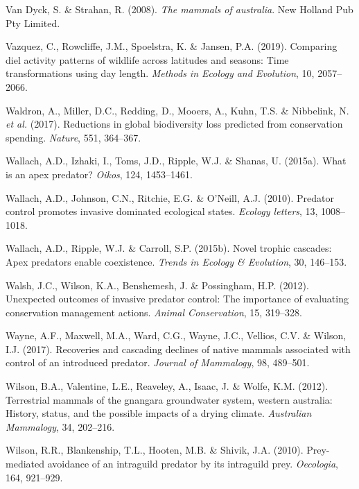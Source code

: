 \documentclass[11pt,a4paper,titlepage,twoside,openright]{style/unimelbthesis}
\begin{document}
\begin{mainmatter}
\leavevmode\hypertarget{ref-van2008mammals}{}%
Van Dyck, S. \& Strahan, R. (2008). \emph{The mammals of australia}. New Holland Pub Pty Limited.

\leavevmode\hypertarget{ref-vazquez2019comparing}{}%
Vazquez, C., Rowcliffe, J.M., Spoelstra, K. \& Jansen, P.A. (2019). Comparing diel activity patterns of wildlife across latitudes and seasons: Time transformations using day length. \emph{Methods in Ecology and Evolution}, 10, 2057--2066.

\leavevmode\hypertarget{ref-waldron2017reductions}{}%
Waldron, A., Miller, D.C., Redding, D., Mooers, A., Kuhn, T.S. \& Nibbelink, N. \emph{et al.} (2017). Reductions in global biodiversity loss predicted from conservation spending. \emph{Nature}, 551, 364--367.

\leavevmode\hypertarget{ref-wallach2015apex}{}%
Wallach, A.D., Izhaki, I., Toms, J.D., Ripple, W.J. \& Shanas, U. (2015a). What is an apex predator? \emph{Oikos}, 124, 1453--1461.

\leavevmode\hypertarget{ref-wallach2010predator}{}%
Wallach, A.D., Johnson, C.N., Ritchie, E.G. \& O'Neill, A.J. (2010). Predator control promotes invasive dominated ecological states. \emph{Ecology letters}, 13, 1008--1018.

\leavevmode\hypertarget{ref-wallach2015novel}{}%
Wallach, A.D., Ripple, W.J. \& Carroll, S.P. (2015b). Novel trophic cascades: Apex predators enable coexistence. \emph{Trends in Ecology \& Evolution}, 30, 146--153.

\leavevmode\hypertarget{ref-walsh2012unexpected}{}%
Walsh, J.C., Wilson, K.A., Benshemesh, J. \& Possingham, H.P. (2012). Unexpected outcomes of invasive predator control: The importance of evaluating conservation management actions. \emph{Animal Conservation}, 15, 319--328.

\leavevmode\hypertarget{ref-wayne2017recoveries}{}%
Wayne, A.F., Maxwell, M.A., Ward, C.G., Wayne, J.C., Vellios, C.V. \& Wilson, I.J. (2017). Recoveries and cascading declines of native mammals associated with control of an introduced predator. \emph{Journal of Mammalogy}, 98, 489--501.

\leavevmode\hypertarget{ref-wilson2012terrestrial}{}%
Wilson, B.A., Valentine, L.E., Reaveley, A., Isaac, J. \& Wolfe, K.M. (2012). Terrestrial mammals of the gnangara groundwater system, western australia: History, status, and the possible impacts of a drying climate. \emph{Australian Mammalogy}, 34, 202--216.

\leavevmode\hypertarget{ref-wilson2010prey}{}%
Wilson, R.R., Blankenship, T.L., Hooten, M.B. \& Shivik, J.A. (2010). Prey-mediated avoidance of an intraguild predator by its intraguild prey. \emph{Oecologia}, 164, 921--929.


\end{mainmatter}
\end{document}
